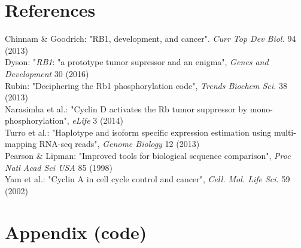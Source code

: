 \documentclass{article}
\begin{document}
\section{References}
Chinnam \& Goodrich: "RB1, development, and cancer". \textit{Curr Top Dev Biol.} 94 (2013)\\
Dyson: "\textit{RB1}: "a prototype tumor supressor and an enigma", \textit{Genes and Development} 30 (2016)\\
Rubin: "Deciphering the Rb1 phosphorylation code", \textit{Trends Biochem Sci.} 38 (2013)\\
Narasimha et al.: "Cyclin D activates the Rb tumor suppressor by mono-phosphorylation", \textit{eLife} 3 (2014)\\
Turro et al.: "Haplotype and isoform specific expression estimation using multi-mapping RNA-seq reads", \textit{Genome Biology} 12 (2013)\\
Pearson \& Lipman: "Improved tools for biological sequence comparison", \textit{Proc Natl Acad Sci USA} 85 (1998)\\
Yam et al.: "Cyclin A in cell cycle control and cancer", \textit{Cell. Mol. Life Sci.} 59 (2002)

\section{Appendix (code)}

\lstset{basicstyle=\footnotesize}

%
\end{document}
